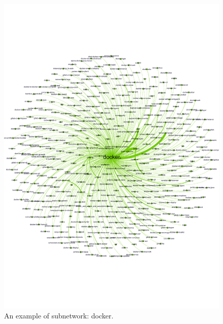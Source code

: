 \documentclass[sigconf]{acmart}
\begin{document}
\begin{figure}[h!]
\centering
\includegraphics[width=1\columnwidth]{picture/image_network_docker1.pdf}\vspace{-0.3cm}
\caption{An example of subnetwork: docker.}
\label{fig:docker}
\end{figure}
\end{document}
